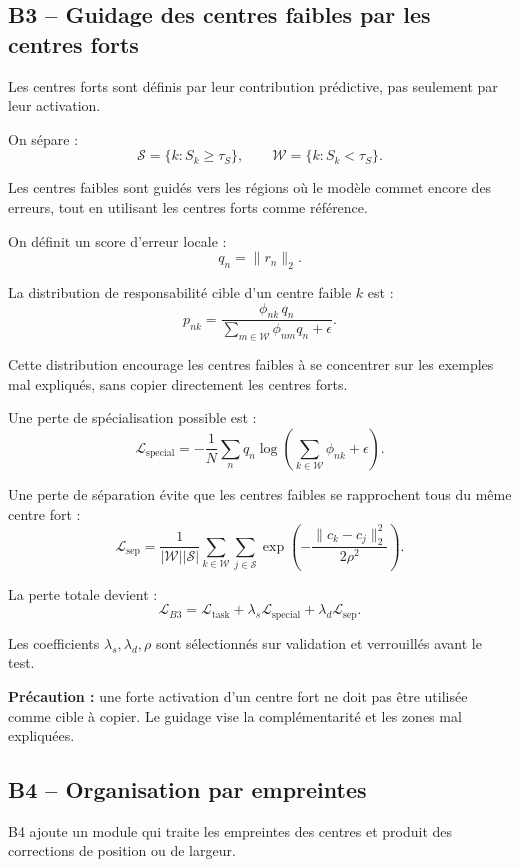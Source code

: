 \documentclass[11pt,a4paper]{article}
\begin{document}
\subsection{B3 -- Guidage des centres faibles par les centres forts}

Les centres forts sont définis par leur contribution prédictive,
pas seulement par leur activation.

On sépare :
\[
\mathcal{S}=\{k:S_k\geq\tau_S\},
\qquad
\mathcal{W}=\{k:S_k<\tau_S\}.
\]

Les centres faibles sont guidés vers les régions où le modèle commet
encore des erreurs, tout en utilisant les centres forts comme référence.

On définit un score d'erreur locale :
\[
q_n= \|r_n\|_2.
\]

La distribution de responsabilité cible d'un centre faible \(k\) est :
\[
p_{nk}
=
\frac{
\phi_{nk}\,q_n
}{
\sum_{m\in\mathcal{W}}\phi_{nm}q_n+\epsilon
}.
\]

Cette distribution encourage les centres faibles à se concentrer
sur les exemples mal expliqués, sans copier directement les centres forts.

Une perte de spécialisation possible est :
\[
\mathcal{L}_{\mathrm{special}}
=
-\frac{1}{N}\sum_n
q_n\log\left(
\sum_{k\in\mathcal{W}}\phi_{nk}+\epsilon
\right).
\]

Une perte de séparation évite que les centres faibles se rapprochent
tous du même centre fort :
\[
\mathcal{L}_{\mathrm{sep}}
=
\frac{1}{|\mathcal{W}||\mathcal{S}|}
\sum_{k\in\mathcal{W}}\sum_{j\in\mathcal{S}}
\exp\left(-\frac{\|c_k-c_j\|_2^2}{2\rho^2}\right).
\]

La perte totale devient :
\[
\mathcal{L}_{B3}
=
\mathcal{L}_{\mathrm{task}}
+\lambda_s\mathcal{L}_{\mathrm{special}}
+\lambda_d\mathcal{L}_{\mathrm{sep}}.
\]

Les coefficients \(\lambda_s,\lambda_d,\rho\) sont sélectionnés sur
validation et verrouillés avant le test.

\textbf{Précaution :} une forte activation d'un centre fort ne doit pas
être utilisée comme cible à copier. Le guidage vise la complémentarité
et les zones mal expliquées.

\subsection{B4 -- Organisation par empreintes}

B4 ajoute un module qui traite les empreintes des centres et produit
des corrections de position ou de largeur.
\end{document}
